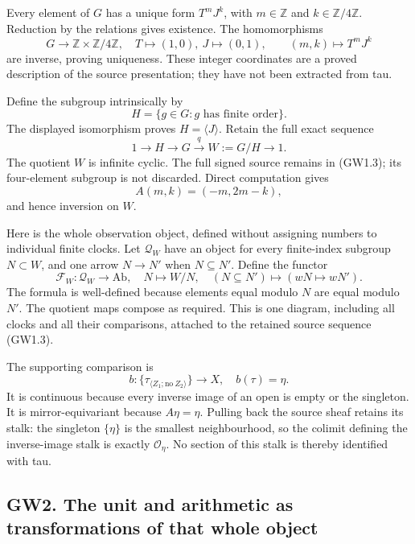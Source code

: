 Every element of \(G\) has a unique form \(T^mJ^k\), with
\(m\in\mathbb Z\) and \(k\in\mathbb Z/4\mathbb Z\). Reduction by the
relations gives existence. The homomorphisms \[
G\longrightarrow\mathbb Z\times\mathbb Z/4\mathbb Z,
\quad T\mapsto(1,0),\ J\mapsto(0,1),
\qquad(m,k)\longmapsto T^mJ^k
\] are inverse, proving uniqueness. These integer coordinates are a
proved description of the source presentation; they have not been
extracted from tau.

Define the subgroup intrinsically by \[
H=\{g\in G:g\text{ has finite order}\}.
\] The displayed isomorphism proves \(H=\langle J\rangle\). Retain the
full exact sequence \[
1\longrightarrow H\longrightarrow G\xrightarrow{q}W:=G/H\longrightarrow1.
\tag{GW1.3}
\] The quotient \(W\) is infinite cyclic. The full signed source remains
in (GW1.3); its four-element subgroup is not discarded. Direct
computation gives \[
A(m,k)=(-m,2m-k),
\] and hence inversion on \(W\).

Here is the whole observation object, defined without assigning numbers
to individual finite clocks. Let \(\mathcal Q_W\) have an object for
every finite-index subgroup \(N\subset W\), and one arrow \(N\to N'\)
when \(N\subseteq N'\). Define the functor \[
\mathcal F_W:\mathcal Q_W\longrightarrow\mathrm{Ab},
\quad N\longmapsto W/N,
\quad (N\subseteq N')\longmapsto(wN\mapsto wN').
\tag{GW1.4}
\] The formula is well-defined because elements equal modulo \(N\) are
equal modulo \(N'\). The quotient maps compose as required. This is one
diagram, including all clocks and all their comparisons, attached to the
retained source sequence (GW1.3).

The supporting comparison is \[
b:\{\tau_{\langle Z_1;\mathrm{no}\ Z_2\rangle}\}\longrightarrow X,
\quad b(\tau)=\eta.
\tag{GW1.5}
\] It is continuous because every inverse image of an open is empty or
the singleton. It is mirror-equivariant because \(A\eta=\eta\). Pulling
back the source sheaf retains its stalk: the singleton \(\{\eta\}\) is
the smallest neighbourhood, so the colimit defining the inverse-image
stalk is exactly \(\mathcal O_\eta\). No section of this stalk is
thereby identified with tau.

\subsection{GW2. The unit and arithmetic as transformations of that
whole
object}\label{gw20260924-gw2.-the-unit-and-arithmetic-as-transformations-of-that-whole-object}

